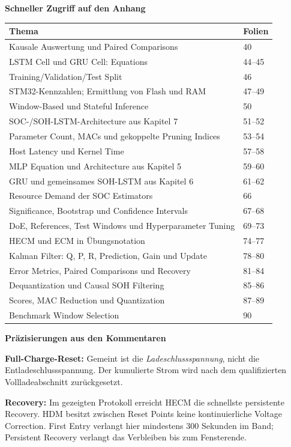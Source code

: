 \textbf{Schneller Zugriff auf den Anhang}\par
\renewcommand{\arraystretch}{1.16}
\begin{tabularx}{\linewidth}{@{}>{\raggedright\arraybackslash}Xl@{}}
\toprule
Thema & Folien \\
\midrule
Kausale Auswertung und Paired Comparisons & 40 \\
LSTM Cell und GRU Cell: Equations & 44--45 \\
Training/Validation/Test Split & 46 \\
STM32-Kennzahlen; Ermittlung von Flash und RAM & 47--49 \\
Window-Based und Stateful Inference & 50 \\
SOC-/SOH-LSTM-Architecture aus Kapitel 7 & 51--52 \\
Parameter Count, MACs und gekoppelte Pruning Indices & 53--54 \\
Host Latency und Kernel Time & 57--58 \\
MLP Equation und Architecture aus Kapitel 5 & 59--60 \\
GRU und gemeinsames SOH-LSTM aus Kapitel 6 & 61--62 \\
Resource Demand der SOC Estimators & 66 \\
Significance, Bootstrap und Confidence Intervals & 67--68 \\
DoE, References, Test Windows und Hyperparameter Tuning & 69--73 \\
HECM und ECM in Übungsnotation & 74--77 \\
Kalman Filter: Q, P, R, Prediction, Gain und Update & 78--80 \\
Error Metrics, Paired Comparisons und Recovery & 81--84 \\
Dequantization und Causal SOH Filtering & 85--86 \\
Scores, MAC Reduction und Quantization & 87--89 \\
Benchmark Window Selection & 90 \\
\bottomrule
\end{tabularx}

\vspace{3mm}
\textbf{Präzisierungen aus den Kommentaren}\par
\textbf{Full-Charge-Reset:} Gemeint ist die \emph{Ladeschlussspannung}, nicht die
Entladeschlussspannung. Der kumulierte Strom wird nach dem qualifizierten
Vollladeabschnitt zurückgesetzt.

\textbf{Recovery:} Im gezeigten Protokoll erreicht HECM die schnellste persistente
Recovery. HDM besitzt zwischen Reset Points keine kontinuierliche Voltage
Correction. First Entry verlangt hier mindestens 300 Sekunden im Band;
Persistent Recovery verlangt das Verbleiben bis zum Fensterende.


